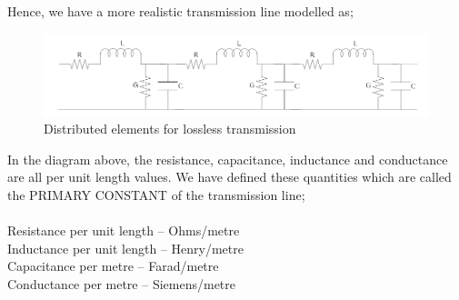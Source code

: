Hence, we have a more realistic transmission line modelled as;\\
\begin{figure}[h]
\centering
\includegraphics[width=1\linewidth]{./graphics/sixth}
\caption{Distributed elements for lossless transmission}
\end{figure}
In the diagram above, the resistance, capacitance, inductance and conductance are all per unit length values. We have defined these quantities which are called the PRIMARY CONSTANT of the transmission line;\\\\
Resistance per unit length – Ohms/metre\\
Inductance per unit length – Henry/metre\\
Capacitance per metre – Farad/metre\\
Conductance per metre – Siemens/metre\\


